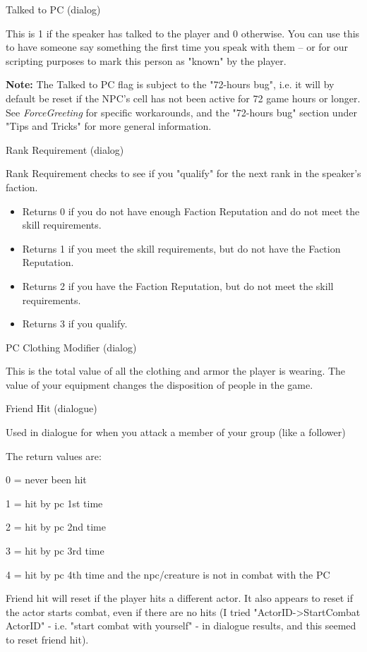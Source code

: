 \documentclass[
]{article}
\begin{document}
Talked to PC (dialog)

This is 1 if the speaker has talked to the player and 0 otherwise. You
can use this to have someone say something the first time you speak with
them -- or for our scripting purposes to mark this person as "known" by
the player.

\textbf{Note:} The Talked to PC flag is subject to the "72-hours bug",
i.e. it will by default be reset if the NPC's cell has not been active
for 72 game hours or longer. See \emph{ForceGreeting} for specific
workarounds, and the "72-hours bug" section under "Tips and Tricks" for
more general information.

Rank Requirement (dialog)

Rank Requirement checks to see if you "qualify" for the next rank in the
speaker's faction.

\begin{itemize}
\item
  Returns 0 if you do not have enough Faction Reputation and do not meet
  the skill requirements.
\item
  Returns 1 if you meet the skill requirements, but do not have the
  Faction Reputation.
\item
  Returns 2 if you have the Faction Reputation, but do not meet the
  skill requirements.
\item
  Returns 3 if you qualify.
\end{itemize}

PC Clothing Modifier (dialog)

This is the total value of all the clothing and armor the player is
wearing. The value of your equipment changes the disposition of people
in the game.

Friend Hit (dialogue)

Used in dialogue for when you attack a member of your group (like a
follower)

The return values are:

0 = never been hit

1 = hit by pc 1st time

2 = hit by pc 2nd time

3 = hit by pc 3rd time

4 = hit by pc 4th time and the npc/creature is not in combat with the PC

Friend hit will reset if the player hits a different actor. It also
appears to reset if the actor starts combat, even if there are no hits
(I tried "ActorID-\textgreater StartCombat ActorID" - i.e. "start combat
with yourself" - in dialogue results, and this seemed to reset friend
hit).
\end{document}
